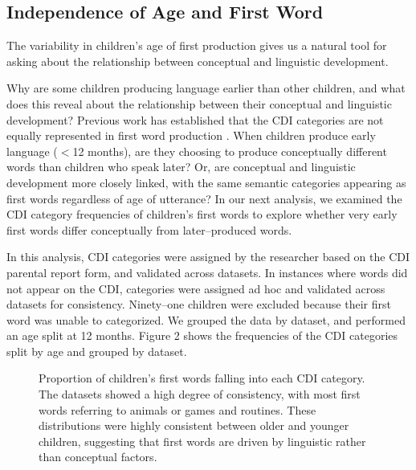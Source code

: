 \documentclass[10pt,letterpaper]{article}
\begin{document}
\subsection{Independence of Age and First Word}

The variability in children's age of first production gives us a natural tool for asking about the relationship between conceptual and linguistic development. 

\cite{snedeker2007,snedeker2012,gleitman1990}

Why are some children producing language earlier than other children, and what does this reveal about the relationship between their conceptual and linguistic development? Previous work has established that the CDI categories are not equally represented in first word production \cite{fenson1994}. When children produce early language ($<$12 months), are they choosing to produce conceptually different words than children who speak later? Or, are conceptual and linguistic development more closely linked, with the same semantic categories appearing as first words regardless of age of utterance? In our next analysis, we examined the CDI category frequencies of children's first words to explore whether very early first words differ conceptually from later--produced words. 

In this analysis, CDI categories were assigned by the researcher based on the CDI parental report form, and validated across datasets. In instances where words did not appear on the CDI, categories were assigned ad hoc and validated across datasets for consistency. Ninety--one children were excluded because their first word was unable to categorized. We grouped the data by dataset, and performed an age split at 12 months. Figure 2 shows the frequencies of the CDI categories split by age and grouped by dataset.

\begin{figure}[tb]
\caption{\label{fig:cdi_cats} Proportion of children's first words falling into each CDI category. The datasets showed a high degree of consistency, with most first words referring to animals or games and routines. These distributions were highly consistent between older and younger children, suggesting that first words are driven by linguistic rather than conceptual factors.}
\end{figure}
\end{document}
